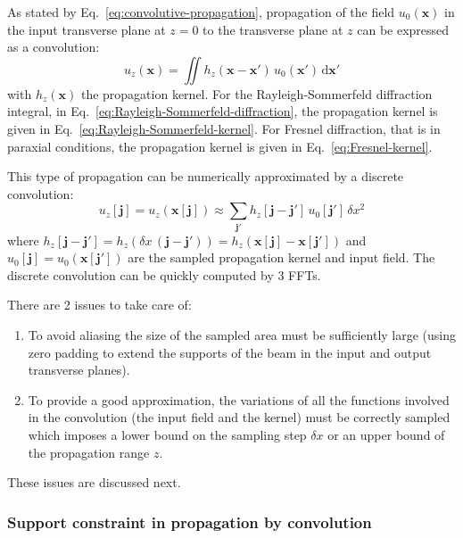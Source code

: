\documentclass[a4paper]{article}
\newcommand{\V}[1]{\boldsymbol{#1}}
\newcommand*{\mathd}{\mathrm{d}}
\begin{document}
As stated by Eq.~\eqref{eq:convolutive-propagation}, propagation of the field
$u_{0}(\V{x})$ in the input transverse plane at $z=0$ to the transverse plane
at $z$ can be expressed as a convolution:
\begin{equation}
  u_{z}(\V{x}) =
  \iint h_{z}(\V{x} - \V{x}')\, u_{0}(\V{x}')\,\mathd\V{x}'
\end{equation}
with $h_{z}(\V{x})$ the propagation kernel. For the Rayleigh-Sommerfeld
diffraction integral, in Eq.~\eqref{eq:Rayleigh-Sommerfeld-diffraction}, the
propagation kernel is given in Eq.~\eqref{eq:Rayleigh-Sommerfeld-kernel}. For
Fresnel diffraction, that is in paraxial conditions, the propagation kernel is
given in Eq.~\eqref{eq:Fresnel-kernel}.

This type of propagation can be numerically approximated by a discrete
convolution:
\begin{equation}
  \label{eq:discrete-convolution}
  u_{z}[\V{j}] = u_{z}(\V{x}[\V{j}])
  \approx \sum_{\V{j}'}h_{z}[\V{j} - \V{j}']\,u_{0}[\V{j}']\,δx^{2}
\end{equation}
where
$h_{z}[\V{j} - \V{j}'] = h_{z}(δx\,(\V{j} - \V{j}')) = h_{z}(\V{x}[\V{j}] - \V{x}[\V{j}'])$
and $u_{0}[\V{j}] = u_{0}(\V{x}[\V{j}'])$ are the sampled propagation kernel
and input field. The discrete convolution can be quickly computed by 3 FFTs.

There are 2 issues to take care of:
\begin{enumerate}
\item To avoid aliasing the size of the sampled area must be sufficiently large
      (using zero padding to extend the supports of the beam in the input and
      output transverse planes).
\item To provide a good approximation, the variations of all the functions
      involved in the convolution (the input field and the kernel) must be
      correctly sampled which imposes a lower bound on the sampling step $δx$
      or an upper bound of the propagation range $z$.
\end{enumerate}

These issues are discussed next.

\subsubsection{Support constraint in propagation by convolution}
\end{document}
